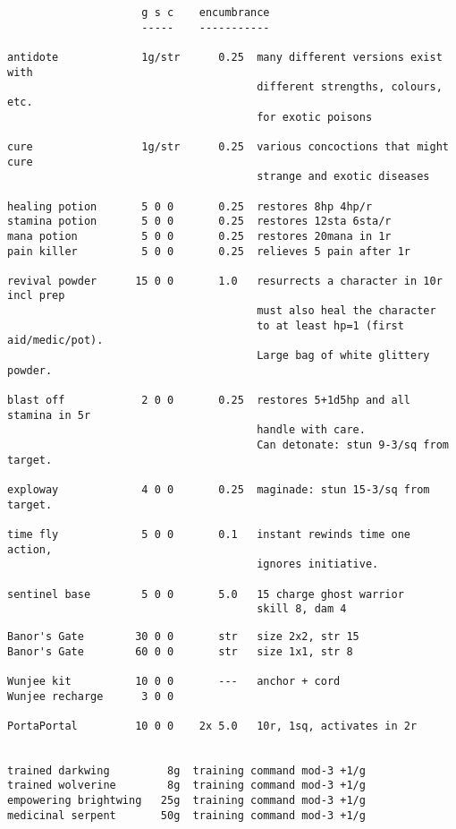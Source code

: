 \small
\begin{verbatim}
                     g s c    encumbrance
                     -----    -----------

antidote             1g/str      0.25  many different versions exist with
                                       different strengths, colours, etc.
                                       for exotic poisons

cure                 1g/str      0.25  various concoctions that might cure
                                       strange and exotic diseases

healing potion       5 0 0       0.25  restores 8hp 4hp/r
stamina potion       5 0 0       0.25  restores 12sta 6sta/r
mana potion          5 0 0       0.25  restores 20mana in 1r
pain killer          5 0 0       0.25  relieves 5 pain after 1r

revival powder      15 0 0       1.0   resurrects a character in 10r incl prep
                                       must also heal the character
                                       to at least hp=1 (first aid/medic/pot).
                                       Large bag of white glittery powder.

blast off            2 0 0       0.25  restores 5+1d5hp and all stamina in 5r
                                       handle with care.
                                       Can detonate: stun 9-3/sq from target.

exploway             4 0 0       0.25  maginade: stun 15-3/sq from target.

time fly             5 0 0       0.1   instant rewinds time one action, 
                                       ignores initiative.

sentinel base        5 0 0       5.0   15 charge ghost warrior
                                       skill 8, dam 4

\end{verbatim} \goodbreak \begin{verbatim}
Banor's Gate        30 0 0       str   size 2x2, str 15
Banor's Gate        60 0 0       str   size 1x1, str 8

Wunjee kit          10 0 0       ---   anchor + cord
Wunjee recharge      3 0 0

PortaPortal         10 0 0    2x 5.0   10r, 1sq, activates in 2r


trained darkwing         8g  training command mod-3 +1/g
trained wolverine        8g  training command mod-3 +1/g
empowering brightwing   25g  training command mod-3 +1/g
medicinal serpent       50g  training command mod-3 +1/g

\end{verbatim}
\normalsize







